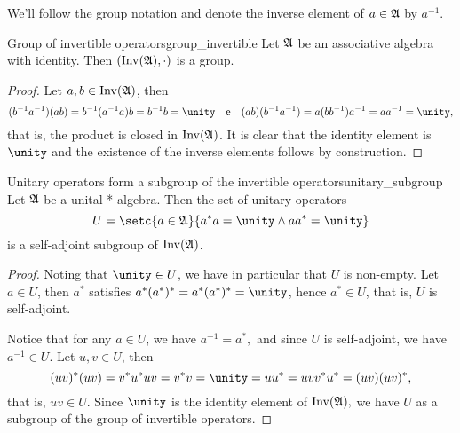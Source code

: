 We'll follow the group notation and denote the inverse element of \(a \in \mathfrak{A}\) by \(a^{-1}\).
\begin{proposition}{Group of invertible operators}{group_invertible}
    Let \(\mathfrak{A}\) be an associative algebra with identity. Then \((\operatorname{Inv}(\mathfrak{A}), \cdot)\) is a group.
\end{proposition}
\begin{proof}
    Let \(a, b \in \operatorname{Inv}(\mathfrak{A})\), then
    \begin{equation*}
        (b^{-1} a^{-1}) (ab) = b^{-1} (a^{-1}a)b = b^{-1}b = \unity\quad\text{e}\quad
        (ab) (b^{-1} a^{-1}) = a(bb^{-1})a^{-1} = aa^{-1} = \unity,
    \end{equation*}
    that is, the product is closed in \(\operatorname{Inv}(\mathfrak{A})\). It is clear that the identity element is \(\unity\) and the existence of the inverse elements follows by construction.
\end{proof}
\begin{proposition}{Unitary operators form a subgroup of the invertible operators}{unitary_subgroup}
    Let \(\mathfrak{A}\) be a unital *-algebra. Then the set of unitary operators
    \begin{equation*}
        U = \setc{a \in \algebra{A}}{a^*a = \unity \land aa^* = \unity}
    \end{equation*}
     is a self-adjoint subgroup of \(\operatorname{Inv}(\mathfrak{A})\).
\end{proposition}
\begin{proof}
    Noting that \(\unity \in U\), we have in particular that \(U\) is non-empty. Let \(a \in U\), then \(a^*\) satisfies \(a^*(a^*)^* = a^*(a^*)^*= \unity\), hence \(a^* \in U\), that is, \(U\) is self-adjoint.

    Notice that for any \(a \in U\), we have \(a^{-1} = a^*,\) and since \(U\) is self-adjoint, we have \(a^{-1} \in U\). Let \(u,v \in U\), then
    \begin{equation*}
        (uv)^*(uv) = v^*u^*uv = v^* v = \unity = uu^* = uvv^*u^* = (uv)(uv)^*,
    \end{equation*}
    that is, \(uv \in U\). Since \(\unity\) is the identity element of \(\operatorname{Inv}(\mathfrak{A}),\) we have \(U\) as a subgroup of the group of invertible operators.
\end{proof}

